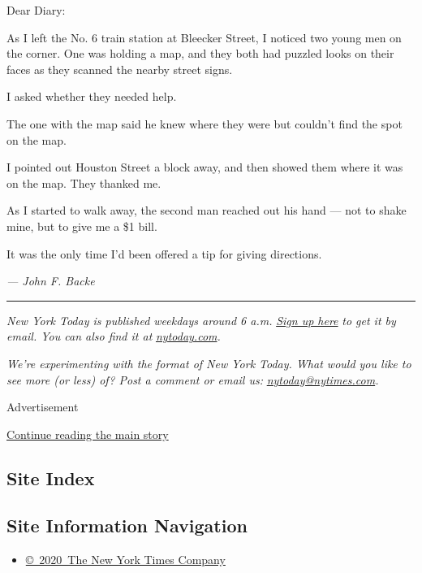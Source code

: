 Dear Diary:

As I left the No. 6 train station at Bleecker Street, I noticed two
young men on the corner. One was holding a map, and they both had
puzzled looks on their faces as they scanned the nearby street signs.

I asked whether they needed help.

The one with the map said he knew where they were but couldn't find the
spot on the map.

I pointed out Houston Street a block away, and then showed them where it
was on the map. They thanked me.

As I started to walk away, the second man reached out his hand --- not
to shake mine, but to give me a \$1 bill.

It was the only time I'd been offered a tip for giving directions.

\emph{--- John F. Backe}

\begin{center}\rule{0.5\linewidth}{\linethickness}\end{center}

\emph{New York Today is published weekdays around 6 a.m.}
\href{https://www.nytimes.com/newsletters/newyorktoday?module=inline}{\emph{Sign
up here}} \emph{to get it by email. You can also find it at}
\href{http://www.nytoday.com/}{\emph{nytoday.com}}\emph{.}

\emph{We're experimenting with the format of New York Today. What would
you like to see more (or less) of? Post a comment or email us:}
\href{mailto:nytoday@nytimes.com}{\emph{nytoday@nytimes.com}}\emph{.}

Advertisement

\protect\hyperlink{after-bottom}{Continue reading the main story}

\hypertarget{site-index}{%
\subsection{Site Index}\label{site-index}}

\hypertarget{site-information-navigation}{%
\subsection{Site Information
Navigation}\label{site-information-navigation}}

\begin{itemize}
\tightlist
\item
  \href{https://help.nytimes.com/hc/en-us/articles/115014792127-Copyright-notice}{©~2020~The
  New York Times Company}
\end{itemize}

